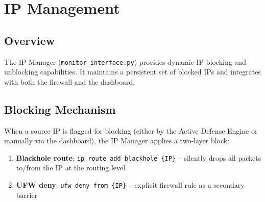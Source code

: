 \documentclass[12pt,a4paper]{article}
\begin{document}
\section{IP Management}
\label{sec:ipm}

\subsection{Overview}

The IP Manager (\texttt{monitor\_interface.py}) provides dynamic IP blocking and unblocking capabilities. It maintains a persistent set of blocked IPs and integrates with both the firewall and the dashboard.

\subsection{Blocking Mechanism}

When a source IP is flagged for blocking (either by the Active Defense Engine or manually via the dashboard), the IP Manager applies a two-layer block:

\begin{enumerate}[leftmargin=*, itemsep=3pt]
    \item \textbf{Blackhole route}: \texttt{ip route add blackhole \{IP\}} -- silently drops all packets to/from the IP at the routing level
    \item \textbf{UFW deny}: \texttt{ufw deny from \{IP\}} -- explicit firewall rule as a secondary barrier
\end{enumerate}
\end{document}
